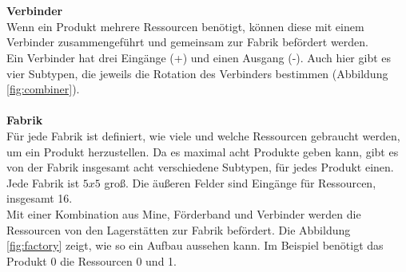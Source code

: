 \\\\
\textbf{Verbinder}\\
Wenn ein Produkt mehrere Ressourcen benötigt, können diese mit einem Verbinder zusammengeführt und gemeinsam zur Fabrik befördert werden. 
\\
Ein Verbinder hat drei Eingänge (+) und einen Ausgang (-). Auch hier gibt es vier Subtypen, die jeweils die Rotation des Verbinders bestimmen (Abbildung \ref{fig:combiner}).
\\\\
\textbf{Fabrik}\\
Für jede Fabrik ist definiert, wie viele und welche Ressourcen gebraucht werden, um ein Produkt herzustellen. Da es maximal acht Produkte geben kann, gibt es von der Fabrik insgesamt acht verschiedene Subtypen, für jedes Produkt einen. Jede Fabrik ist $5x5$ groß. Die äußeren Felder sind Eingänge für Ressourcen, insgesamt 16.
\\
Mit einer Kombination aus Mine, Förderband und Verbinder werden die Ressourcen von den Lagerstätten zur Fabrik befördert. Die Abbildung \ref{fig:factory} zeigt, wie so ein Aufbau aussehen kann. Im Beispiel benötigt das Produkt 0 die Ressourcen 0 und 1.

